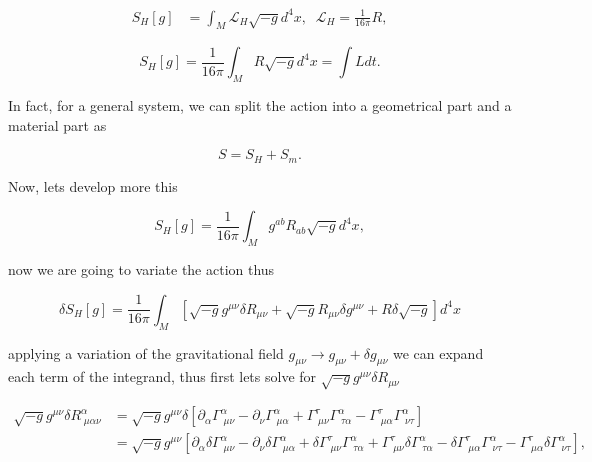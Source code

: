         \begin{align}
            S_H[g]&=\int_M \mathcal{L}_H\sqrt{-g}d^4x,\;\;\mathcal{L}_H = \frac{1}{16\pi}R,
        \end{align}

        \begin{equation}
            S_H[g] = \frac{1}{16\pi}\int_MR\sqrt{-g}d^4x = \int L dt.
        \end{equation}

        In fact, for a general system, we can split the action into a geometrical part and a material part as 

        \begin{equation}
            S = S_H + S_m.
        \end{equation}

        Now, lets develop more this

        \begin{equation}
            S_H[g] = \frac{1}{16\pi}\int_Mg^{ab}R_{ab}\sqrt{-g}d^4x,
        \end{equation}

        now we are going to variate the action thus

        \begin{equation}
            \delta S_H[g] = \frac{1}{16\pi}\int_M\left[\sqrt{-g}g^{\mu\nu}\delta R_{\mu\nu} + \sqrt{-g}R_{\mu\nu}\delta g^{\mu\nu} + R\delta\sqrt{-g} \right]d^4x
        \end{equation}

        applying a variation of the gravitational field $g_{\mu\nu}\rightarrow g_{\mu\nu}+\delta g_{\mu\nu}$ we can expand each term of the integrand, thus first lets solve for $\sqrt{-g}g^{\mu\nu}\delta R_{\mu\nu}$

        \begin{align*}
            \sqrt{-g}g^{\mu\nu}\delta R^{\alpha}_{\;\mu\alpha\nu} &= \sqrt{-g}g^{\mu\nu}\delta\left[\partial_{\alpha}\Gamma^{\alpha}_{\;\mu\nu} - \partial_{\nu}\Gamma^{\alpha}_{\;\mu\alpha} + \Gamma^{\tau}_{\;\mu\nu}\Gamma^{\alpha}_{\;\tau\alpha} - \Gamma^{\tau}_{\;\mu\alpha}\Gamma^{\alpha}_{\;\nu\tau} \right]\\
            &= \sqrt{-g}g^{\mu\nu}\left[\partial_{\alpha}\delta\Gamma^{\alpha}_{\;\mu\nu} - \partial_{\nu}\delta\Gamma^{\alpha}_{\;\mu\alpha} + \delta\Gamma^{\tau}_{\;\mu\nu}\Gamma^{\alpha}_{\;\tau\alpha} + \Gamma^{\tau}_{\;\mu\nu}\delta\Gamma^{\alpha}_{\;\tau\alpha} - \delta\Gamma^{\tau}_{\;\mu\alpha}\Gamma^{\alpha}_{\;\nu\tau} - \Gamma^{\tau}_{\;\mu\alpha}\delta\Gamma^{\alpha}_{\;\nu\tau} \right],
        \end{align*}

